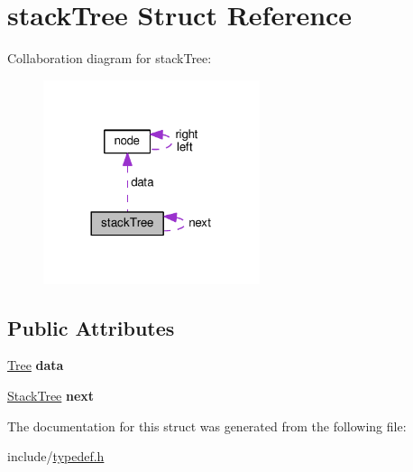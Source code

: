 \hypertarget{structstackTree}{}\section{stack\+Tree Struct Reference}
\label{structstackTree}


Collaboration diagram for stack\+Tree\+:\nopagebreak
\begin{figure}[H]
\begin{center}
\leavevmode
\includegraphics[width=180pt]{structstackTree__coll__graph}
\end{center}
\end{figure}
\subsection*{Public Attributes}
\begin{DoxyCompactItemize}
\item 
\hyperlink{structnode}{Tree} {\bfseries data}\hypertarget{structstackTree_a0948f3bec59d376fcb496088ef1eb390}{}\label{structstackTree_a0948f3bec59d376fcb496088ef1eb390}

\item 
\hyperlink{structstackTree}{Stack\+Tree} {\bfseries next}\hypertarget{structstackTree_ab01d5af00bf143c04cdb6c03ff3b4fb5}{}\label{structstackTree_ab01d5af00bf143c04cdb6c03ff3b4fb5}

\end{DoxyCompactItemize}


The documentation for this struct was generated from the following file\+:\begin{DoxyCompactItemize}
\item 
include/\hyperlink{typedef_8h}{typedef.\+h}\end{DoxyCompactItemize}
